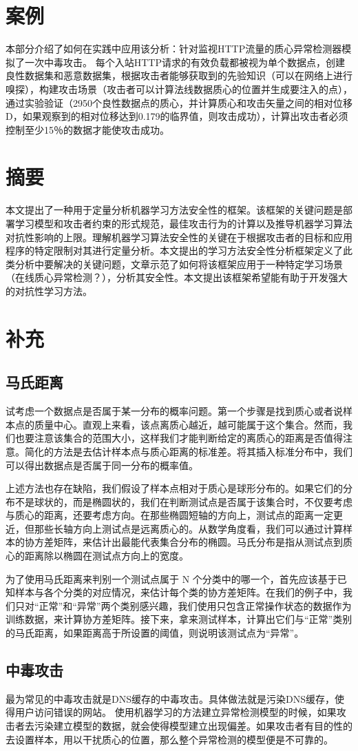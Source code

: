 \documentclass[UTF8]{ctexart}
\begin{document}
	\section{案例}\label{sec:disijie}
	本部分介绍了如何在实践中应用该分析：针对监视HTTP流量的质心异常检测器模拟了一次中毒攻击。 每个入站HTTP请求的有效负载都被视为单个数据点，创建良性数据集和恶意数据集，根据攻击者能够获取到的先验知识（可以在网络上进行嗅探），构建攻击场景（攻击者可以计算法线数据质心的位置并生成要注入的点），通过实验验证（2950个良性数据点的质心，并计算质心和攻击矢量之间的相对位移D，如果观察到的相对位移达到0.179的临界值，则攻击成功），计算出攻击者必须控制至少15％的数据才能使攻击成功。
	\clearpage
	\section{摘要}\label{sec:diwujie}
	本文提出了一种用于定量分析机器学习方法安全性的框架。该框架的关键问题是部署学习模型和攻击者约束的形式规范，最佳攻击行为的计算以及推导机器学习算法对抗性影响的上限。理解机器学习算法安全性的关键在于根据攻击者的目标和应用程序的特定限制对其进行定量分析。本文提出的学习方法安全性分析框架定义了此类分析中要解决的关键问题，文章示范了如何将该框架应用于一种特定学习场景（在线质心异常检测？），分析其安全性。本文提出该框架希望能有助于开发强大的对抗性学习方法。
	\clearpage
	\section{补充}\label{sec:diliujie}
	\subsection{马氏距离}
	试考虑一个数据点是否属于某一分布的概率问题。第一个步骤是找到质心或者说样本点的质量中心。直观上来看，该点离质心越近，越可能属于这个集合。然而，我们也要注意该集合的范围大小，这样我们才能判断给定的离质心的距离是否值得注意。简化的方法是去估计样本点与质心距离的标准差。将其插入标准分布中，我们可以得出数据点是否属于同一分布的概率值。
	
	上述方法也存在缺陷，我们假设了样本点相对于质心是球形分布的。如果它们的分布不是球状的，而是椭圆状的，我们在判断测试点是否属于该集合时，不仅要考虑与质心的距离，还要考虑方向。在那些椭圆短轴的方向上，测试点的距离一定更近，但那些长轴方向上测试点是远离质心的。从数学角度看，我们可以通过计算样本的协方差矩阵，来估计出最能代表集合分布的椭圆。马氏分布是指从测试点到质心的距离除以椭圆在测试点方向上的宽度。

	为了使用马氏距离来判别一个测试点属于 N 个分类中的哪一个，首先应该基于已知样本与各个分类的对应情况，来估计每个类的协方差矩阵。在我们的例子中，我们只对“正常”和“异常”两个类别感兴趣，我们使用只包含正常操作状态的数据作为训练数据，来计算协方差矩阵。接下来，拿来测试样本，计算出它们与“正常”类别的马氏距离，如果距离高于所设置的阈值，则说明该测试点为“异常”。 

	\subsection{中毒攻击}
	最为常见的中毒攻击就是DNS缓存的中毒攻击。具体做法就是污染DNS缓存，使得用户访问错误的网站。
	使用机器学习的方法建立异常检测模型的时候，如果攻击者去污染建立模型的数据，就会使得模型建立出现偏差。如果攻击者有目的性的去设置样本，用以干扰质心的位置，那么整个异常检测的模型便是不可靠的。
	\clearpage
	
\end{document}
